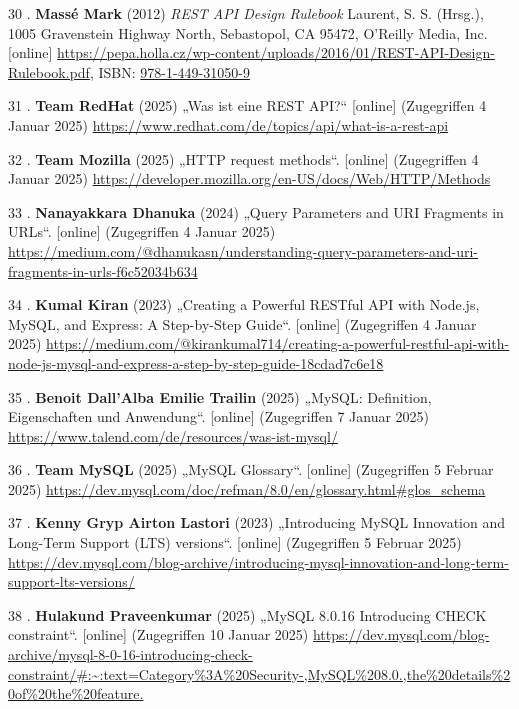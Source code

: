 \documentclass[
    headings=optiontotocandhead,%
    twoside,
    numbers=noenddot,%
    12pt, %
    titlepage, %
    parskip=full, %
    listof=leveldown, 
    numbers=noenddot, %
    a4paper,DIV=14,
    BCOR=15mm,
]{scrbook}
\newlength{\cslhangindent}
\newenvironment{cslreferences}%
  {\setlength{\parindent}{0pt}%
  \everypar{\setlength{\hangindent}{\cslhangindent}}\ignorespaces}%
  {\par}
\begin{document}
\begin{cslreferences}
\leavevmode\hypertarget{ref-REST-API-Design-Rulebook}{}%
30 . \textbf{Massé Mark} (2012) \emph{REST API Design Rulebook} Laurent,
S. S. (Hrsg.), 1005 Gravenstein Highway North, Sebastopol, CA 95472,
O'Reilly Media, Inc. {[}online{]}
\url{https://pepa.holla.cz/wp-content/uploads/2016/01/REST-API-Design-Rulebook.pdf},
ISBN:
\href{https://worldcat.org/isbn/978-1-449-31050-9}{978-1-449-31050-9}

\leavevmode\hypertarget{ref-redhat-rest}{}%
31 . \textbf{Team RedHat} (2025) „Was ist eine REST API?{}``
{[}online{]} (Zugegriffen 4 Januar 2025)
\url{https://www.redhat.com/de/topics/api/what-is-a-rest-api}

\leavevmode\hypertarget{ref-mozilla-rest}{}%
32 . \textbf{Team Mozilla} (2025) „HTTP request methods``. {[}online{]}
(Zugegriffen 4 Januar 2025)
\url{https://developer.mozilla.org/en-US/docs/Web/HTTP/Methods}

\leavevmode\hypertarget{ref-medium-uri-fragment}{}%
33 . \textbf{Nanayakkara Dhanuka} (2024) „Query Parameters and URI
Fragments in URLs``. {[}online{]} (Zugegriffen 4 Januar 2025)
\url{https://medium.com/@dhanukasn/understanding-query-parameters-and-uri-fragments-in-urls-f6c52034b634}

\leavevmode\hypertarget{ref-medium-rest-node-js}{}%
34 . \textbf{Kumal Kiran} (2023) „Creating a Powerful RESTful API with
Node.js, MySQL, and Express: A Step-by-Step Guide``. {[}online{]}
(Zugegriffen 4 Januar 2025)
\url{https://medium.com/@kirankumal714/creating-a-powerful-restful-api-with-node-js-mysql-and-express-a-step-by-step-guide-18cdad7c6e18}

\leavevmode\hypertarget{ref-talend-mysql}{}%
35 . \textbf{Benoit Dall'Alba Emilie Trailin} (2025) „MySQL: Definition,
Eigenschaften und Anwendung``. {[}online{]} (Zugegriffen 7 Januar 2025)
\url{https://www.talend.com/de/resources/was-ist-mysql/}

\leavevmode\hypertarget{ref-mysql-glosar}{}%
36 . \textbf{Team MySQL} (2025) „MySQL Glossary``. {[}online{]}
(Zugegriffen 5 Februar 2025)
\url{https://dev.mysql.com/doc/refman/8.0/en/glossary.html\#glos_schema}

\leavevmode\hypertarget{ref-mysql-lts}{}%
37 . \textbf{Kenny Gryp Airton Lastori} (2023) „Introducing MySQL
Innovation and Long-Term Support (LTS) versions``. {[}online{]}
(Zugegriffen 5 Februar 2025)
\url{https://dev.mysql.com/blog-archive/introducing-mysql-innovation-and-long-term-support-lts-versions/}

\leavevmode\hypertarget{ref-mysql-8.0.16}{}%
38 . \textbf{Hulakund Praveenkumar} (2025) „MySQL 8.0.16 Introducing
CHECK constraint``. {[}online{]} (Zugegriffen 10 Januar 2025)
\url{https://dev.mysql.com/blog-archive/mysql-8-0-16-introducing-check-constraint/\#:~:text=Category\%3A\%20Security-,MySQL\%208.0.,the\%20details\%20of\%20the\%20feature.}


\end{cslreferences}
\end{document}
